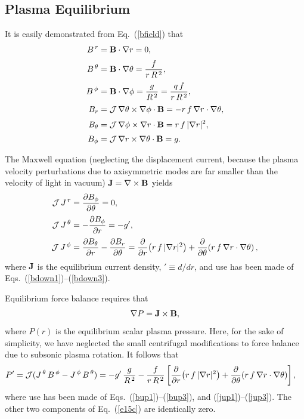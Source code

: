 \documentclass[12pt,prb,aps]{revtex4-1}
\begin{document}
\subsection{Plasma Equilibrium}\label{aequilibrium}
It is easily demonstrated from Eq.~(\ref{bfield}) that\,\cite{tj}
\begin{align}
B^{\,r}&={\bf B}\cdot\nabla r= 0,\label{bup1}\\[0.5ex]
B^{\,\theta} &={\bf B}\cdot\nabla \theta= \frac{f}{r\,R^{\,2}},\label{bup2}\\[0.5ex]
B^{\,\phi} &={\bf B}\cdot\nabla \phi= \frac{g}{R^{\,2}}= \frac{q\,f}{r\,R^{\,2}},\label{bup3}\\[0.5ex]
B_r &={\cal J}\,\nabla\theta\times\nabla\phi\cdot{\bf B}= -r\,f\,\nabla r\cdot\nabla\theta,\label{bdown1}\\[0.5ex]
B_\theta &={\cal J}\,\nabla\phi\times\nabla r\cdot{\bf B}= r\,f\,|\nabla r|^2,\\[0.5ex]
B_\phi &={\cal J}\,\nabla r\times\nabla \theta \cdot{\bf B}= g.\label{bdown3}
\end{align}

The Maxwell equation (neglecting the displacement current, because the plasma velocity perturbations due to axisymmetric modes are far smaller than the velocity of light in vacuum)
${\bf J}= \nabla\times{\bf B}$
yields
\begin{align}
{\cal J}\,J^{\,r} &= \frac{\partial B_\phi}{\partial \theta} =0,\label{jup1}\\[0.5ex]
{\cal J}\,J^{\,\theta} &= -\frac{\partial B_\phi}{\partial r} = - g',\label{jup2}\\[0.5ex]
{\cal J}\,J^{\,\phi}&= \frac{\partial B_\theta}{\partial r} -\frac{\partial B_r}{\partial\theta}=\frac{\partial}{\partial r}\!\left(r\,f\,|\nabla r|^2\right)+ \frac{\partial}{\partial\theta}\!\left(r\,f\,\nabla r\cdot\nabla\theta\right),\label{jup3}
\end{align}
where ${\bf J}$ is the equilibrium current density, $'\equiv d/dr$, and use has been made of  Eqs.~(\ref{bdown1})--(\ref{bdown3}).

Equilibrium force balance requires that
\begin{equation}\label{e15c}
 \nabla P={\bf J}\times {\bf B},
\end{equation}
where $P(r)$ is the equilibrium scalar plasma pressure. Here, for the sake of simplicity, we have neglected the small centrifugal modifications to force balance due to subsonic plasma
rotation.\cite{flow,flow1}
It follows that 
\begin{align}\label{eg1}
P'&= {\cal J}(J^{\,\theta}\,B^{\,\phi}-J^{\,\phi}\,B^{\,\theta})= -g'\,\frac{g}{R^{\,2}} - \frac{f}{r\,R^{\,2}}\left[\frac{\partial}{\partial r}\!\left(r\,f\,|\nabla r|^2\right)+ \frac{\partial}{\partial\theta}\!\left(r\,f\,\nabla r\cdot\nabla\theta\right)\right],
\end{align}
where use has been made of Eqs.~(\ref{bup1})--(\ref{bup3}), and  (\ref{jup1})--(\ref{jup3}). The
other two components of Eq.~(\ref{e15c}) are identically zero. 
\end{document}
